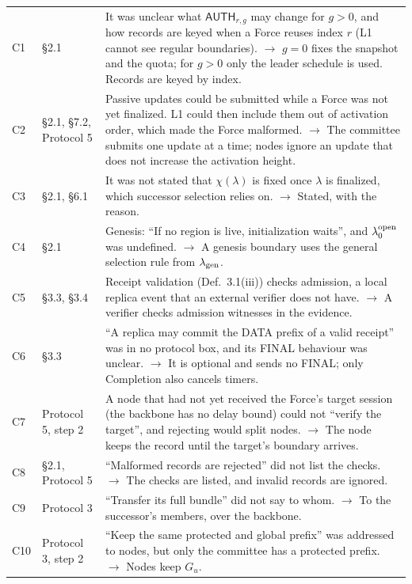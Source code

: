 \documentclass[11pt,a4paper]{article}
\newcommand{\Chg}[1]{\leavevmode\hypertarget{chg:#1}{#1}}
\newcommand{\tagg}[1]{\ensuremath{\mathsf{#1}}}
\newcounter{protocol}
\begin{document}
\begin{xltabular}{\linewidth}{@{}>{\raggedright\arraybackslash}p{.05\linewidth}>{\raggedright\arraybackslash}p{.17\linewidth}Y@{}}
\Chg{C1} & \S2.1 & It was unclear what $\tagg{AUTH}_{r,g}$ may change for $g>0$, and how records are keyed when a Force reuses index $r$ (L1 cannot see regular boundaries). $\rightarrow$ $g=0$ fixes the snapshot and the quota; for $g>0$ only the leader schedule is used. Records are keyed by index.\\
\Chg{C2} & \S2.1, \S7.2, Protocol 5 & Passive updates could be submitted while a Force was not yet finalized. L1 could then include them out of activation order, which made the Force malformed. $\rightarrow$ The committee submits one update at a time; nodes ignore an update that does not increase the activation height.\\
\Chg{C3} & \S2.1, \S6.1 & It was not stated that $\chi(\lambda)$ is fixed once $\lambda$ is finalized, which successor selection relies on. $\rightarrow$ Stated, with the reason.\\
\Chg{C4} & \S2.1 & Genesis: ``If no region is live, initialization waits'', and $\lambda^{\rm open}_0$ was undefined. $\rightarrow$ A genesis boundary uses the general selection rule from $\lambda_{\rm gen}$.\\
\Chg{C5} & \S3.3, \S3.4 & Receipt validation (Def.~3.1(iii)) checks admission, a local replica event that an external verifier does not have. $\rightarrow$ A verifier checks admission witnesses in the evidence.\\
\Chg{C6} & \S3.3 & ``A replica may commit the DATA prefix of a valid receipt'' was in no protocol box, and its FINAL behaviour was unclear. $\rightarrow$ It is optional and sends no FINAL; only Completion also cancels timers.\\
\Chg{C7} & Protocol 5, step 2 & A node that had not yet received the Force's target session (the backbone has no delay bound) could not ``verify the target'', and rejecting would split nodes. $\rightarrow$ The node keeps the record until the target's boundary arrives.\\
\Chg{C8} & \S2.1, Protocol 5 & ``Malformed records are rejected'' did not list the checks. $\rightarrow$ The checks are listed, and invalid records are ignored.\\
\Chg{C9} & Protocol 3 & ``Transfer its full bundle'' did not say to whom. $\rightarrow$ To the successor's members, over the backbone.\\
\Chg{C10} & Protocol 3, step 2 & ``Keep the same protected and global prefix'' was addressed to nodes, but only the committee has a protected prefix. $\rightarrow$ Nodes keep $G_u$.\\

\end{xltabular}
\end{document}

